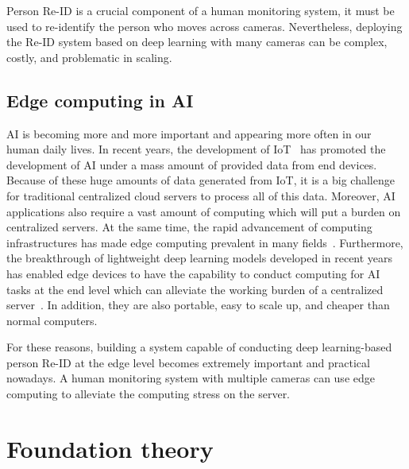 \documentclass[../main.tex]{subfiles}
\begin{document}
Person Re-ID is a crucial component of a human monitoring system, it must be used to re-identify the person who moves across cameras. Nevertheless, deploying the Re-ID system based on deep learning with many cameras can be complex, costly, and problematic in scaling.

\label{sec:reidsystem}
\subsection{Edge computing in AI}
AI is becoming more and more important and appearing more often in our human daily lives. In recent years, the development of IoT~\cite{taivalsaari2018development, sworna2021towards, lakhwani2019development} has promoted the development of AI under a mass amount of provided data from end devices. Because of these huge amounts of data generated from IoT, it is a big challenge for traditional centralized cloud servers to process all of this data. Moreover, AI applications also require a vast amount of computing which will put a burden on centralized servers. At the same time, the rapid advancement of computing infrastructures has made edge computing prevalent in many fields~\cite{singh2023edge}. Furthermore, the breakthrough of lightweight deep learning models developed in recent years~\cite{agarwal2020lightweight} has enabled edge devices to have the capability to conduct computing for AI tasks at the end level which can alleviate the working burden of a centralized server~\cite{sandler2018mobilenetv2}. In addition, they are also portable, easy to scale up, and cheaper than normal computers.

For these reasons, building a system capable of conducting deep learning-based person Re-ID at the edge level becomes extremely important and practical nowadays. A human monitoring system with multiple cameras can use edge computing to alleviate the computing stress on the server.

\section{Foundation theory}
\label{sec:foundtheo}
\end{document}
